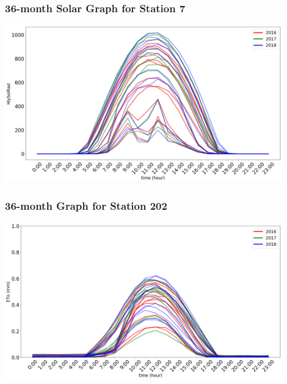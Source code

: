 \begin{frame}
\frametitle{36-month Solar Graph for Station 7}
\centering
\includegraphics[width=0.9\textwidth]{images/3year7solar.png}
\end{frame}


\begin{frame}
\frametitle{36-month Graph for Station 202}
\centering
\includegraphics[width=0.9\textwidth]{images/202multi.png}
\end{frame}

